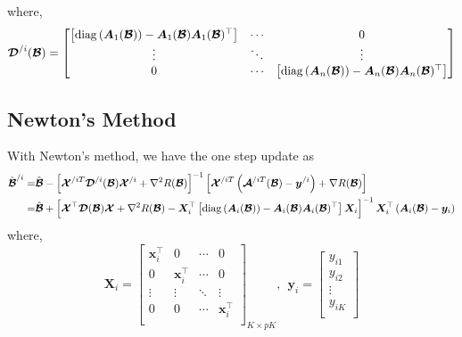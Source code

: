\documentclass[11pt]{article}
\newcommand{\by}{\bm{y}}
\newcommand{\bX}{\bm{X}}
\begin{document}
where,
$$\bm{\mathcal{D}}^{/i}(\bm{\mathcal{B}})=\begin{bmatrix}
\left[{\rm diag}\left(\bm{A}_1(\bm{\mathcal{B}})\right)-\bm{A}_1(\bm{\mathcal{B}})\bm{A}_1(\bm{\mathcal{B}})^\top\right] & \cdots & 0 \\
\vdots & \ddots & \vdots \\
0 & \cdots & \left[{\rm diag}\left(\bm{A}_n(\bm{\mathcal{B}})\right)-\bm{A}_n(\bm{\mathcal{B}})\bm{A}_n(\bm{\mathcal{B}})^\top\right] \\
\end{bmatrix}$$

\subsection{Newton's Method}

With Newton's method, we have the one step update as
$$\begin{aligned}
\tilde{\bm{\mathcal{B}}}^{/i}=&
\hat{\bm{\mathcal{B}}}-\left[\bm{\mathcal{X}}^{/iT}
\bm{\mathcal{D}}^{/i}(\bm{\mathcal{B}})\bm{\mathcal{X}}^{/i}+\nabla^2R(\bm{\mathcal{B}})\right]^{-1}\left[\bm{\mathcal{X}}^{/iT}\left(\bm{\mathcal{A}}^{/iT}(\bm{\mathcal{B}})-\by^{/i}\right)+\nabla R(\bm{\mathcal{B}})\right] \\
=&\hat{\bm{\mathcal{B}}}+\left[\bm{\mathcal{X}}^\top
\bm{\mathcal{D}}(\bm{\mathcal{B}})\bm{\mathcal{X}}+\nabla^2R(\bm{\mathcal{B}})-\bX_i^\top\left[{\rm diag}\left(\bm{A}_i(\bm{\mathcal{B}})\right)-\bm{A}_i(\bm{\mathcal{B}})\bm{A}_i(\bm{\mathcal{B}})^\top\right]\bX_i\right]^{-1}\bX_i^\top\left(\bm{A}_i(\bm{\mathcal{B}})-\by_i\right) \\
\end{aligned}$$
where,
$$\bX_i=
\begin{bmatrix}
\bm{x}_i^\top & 0 & \cdots & 0 \\
0 & \bm{x}_i^\top & \cdots & 0 \\
\vdots & \vdots & \ddots & \vdots \\
0 & 0 & \cdots & \bm{x}_i^\top \\
\end{bmatrix}_{K\times pK},\ \ 
\by_i=\begin{bmatrix}
y_{i1} \\
y_{i2} \\
\vdots \\
y_{iK} \\
\end{bmatrix}$$
\\
\end{document}
